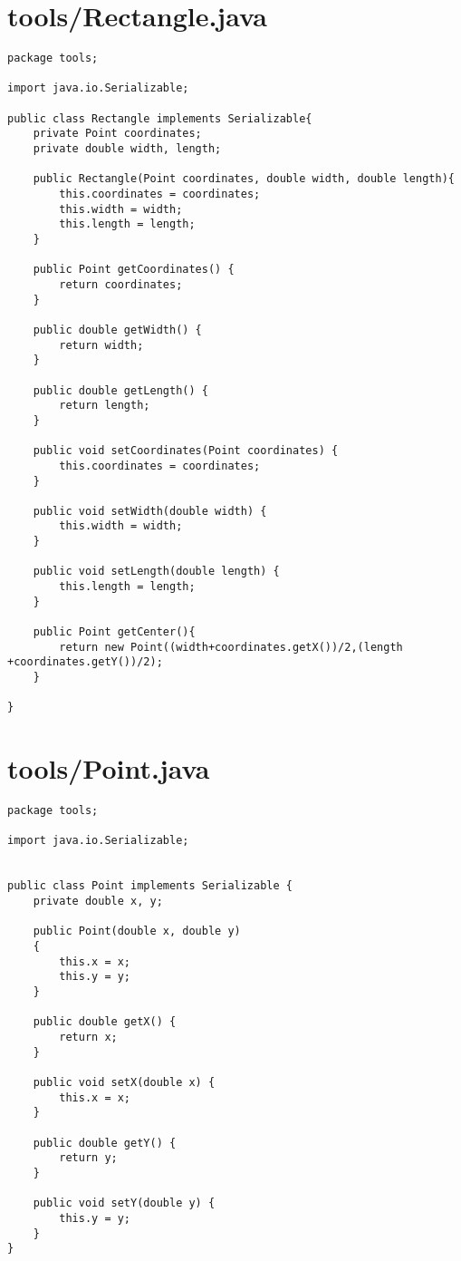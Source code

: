 \documentclass{article}
\begin{document}
\tableofcontents

\newpage
\section{tools/Rectangle.java}
\begin{lstlisting}package tools;

import java.io.Serializable;

public class Rectangle implements Serializable{
    private Point coordinates;
    private double width, length;

    public Rectangle(Point coordinates, double width, double length){
        this.coordinates = coordinates;
        this.width = width;
        this.length = length;
    }

    public Point getCoordinates() {
        return coordinates;
    }

    public double getWidth() {
        return width;
    }

    public double getLength() {
        return length;
    }

    public void setCoordinates(Point coordinates) {
        this.coordinates = coordinates;
    }

    public void setWidth(double width) {
        this.width = width;
    }

    public void setLength(double length) {
        this.length = length;
    }

    public Point getCenter(){
        return new Point((width+coordinates.getX())/2,(length +coordinates.getY())/2);
    }

}
\end{lstlisting}
\newpage
\section{tools/Point.java}
\begin{lstlisting}package tools;

import java.io.Serializable;


public class Point implements Serializable {
    private double x, y;

    public Point(double x, double y)
    {
        this.x = x;
        this.y = y;
    }

    public double getX() {
        return x;
    }

    public void setX(double x) {
        this.x = x;
    }

    public double getY() {
        return y;
    }

    public void setY(double y) {
        this.y = y;
    }
}
\end{lstlisting}
\newpage
\end{document}
